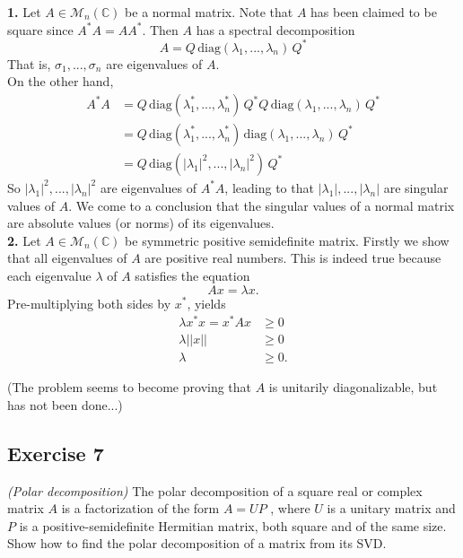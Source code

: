\textbf{1.} Let $A\in\mathcal{M}_n(\mathbb{C})$ be a normal matrix. Note that $A$ has been claimed to be square since $A^*A=AA^*$. Then $A$ has a spectral decomposition 
\begin{equation*}
    A = Q\,\mathrm{diag}(\lambda_1,...,\lambda_n)\,Q^*
\end{equation*} 
That is, $\sigma_1,...,\sigma_n$ are eigenvalues of $A$.\\

On the other hand, 
\begin{align*}
    A^*A &= Q\,\mathrm{diag}(\lambda_1^*,...,\lambda^*_n)\,Q^*Q\,\mathrm{diag}(\lambda_1,...,\lambda_n)\,Q^*\\
    &= Q\,\mathrm{diag}(\lambda_1^*,...,\lambda^*_n)\,\mathrm{diag}(\lambda_1,...,\lambda_n)\,Q^* \\
     &= Q\,\mathrm{diag}(|\lambda_1|^2,...,|\lambda_n|^2)\,Q^*
\end{align*}
So $|\lambda_1|^2,...,|\lambda_n|^2$ are eigenvalues of $A^*A$, leading to that $|\lambda_1|,...,|\lambda_n|$ are singular values of $A$.
We come to a conclusion that the singular values of a normal matrix are absolute values (or norms) of its eigenvalues.\\

\textbf{2.} Let $A\in\mathcal{M}_n(\mathbb{C})$ be symmetric positive semidefinite matrix. Firstly we show that all eigenvalues of $A$ are positive real numbers. This is indeed true because each eigenvalue $\lambda$ of $A$ satisfies the equation $$Ax=\lambda x.$$
Pre-multiplying both sides by $x^*$, yields
\begin{align*}
    \lambda x^*x = x^*Ax &\ge 0\\
    \lambda ||x|| &\ge 0\\
    \lambda &\ge 0.
\end{align*}

(The problem seems to become proving that $A$ is unitarily diagonalizable, but has not been done...)



\subsection*{Exercise 7} \textit{(Polar decomposition)} The polar decomposition of a square real or complex matrix $A$ is a factorization of the form $A = UP$ , where $U$ is a unitary matrix and $P$ is a positive-semidefinite Hermitian
matrix, both square and of the same size. Show how to find the polar decomposition of a matrix from its
SVD.\\

